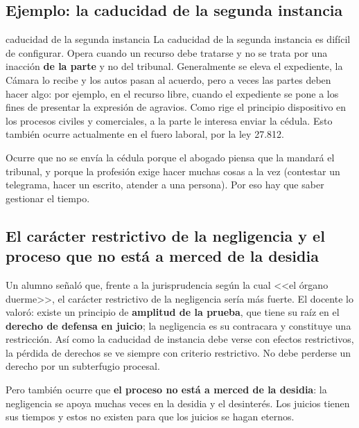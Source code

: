 \documentclass[12pt,oneside]{book}
\begin{document}
\subsection{Ejemplo: la caducidad de la segunda instancia}

\begin{example}{caducidad de la segunda instancia}
La caducidad de la segunda instancia es difícil de configurar. Opera cuando un recurso debe tratarse y no se trata por una inacción \textbf{de la parte} y no del tribunal. Generalmente se eleva el expediente, la Cámara lo recibe y los autos pasan al acuerdo, pero a veces las partes deben hacer algo: por ejemplo, en el recurso libre, cuando el expediente se pone a los fines de presentar la expresión de agravios. Como rige el principio dispositivo en los procesos civiles y comerciales, a la parte le interesa enviar la cédula. Esto también ocurre actualmente en el fuero laboral, por la ley 27.812.

Ocurre que no se envía la cédula porque el abogado piensa que la mandará el tribunal, y porque la profesión exige hacer muchas cosas a la vez (contestar un telegrama, hacer un escrito, atender a una persona). Por eso hay que saber gestionar el tiempo.
\end{example}


\subsection{El carácter restrictivo de la negligencia y el proceso que no está a merced de la desidia}

Un alumno señaló que, frente a la jurisprudencia según la cual <<el órgano duerme>>, el carácter restrictivo de la negligencia sería más fuerte. El docente lo valoró: existe un principio de \textbf{amplitud de la prueba}, que tiene su raíz en el \textbf{derecho de defensa en juicio}; la negligencia es su contracara y constituye una restricción. Así como la caducidad de instancia debe verse con efectos restrictivos, la pérdida de derechos se ve siempre con criterio restrictivo. No debe perderse un derecho por un subterfugio procesal.

Pero también ocurre que \textbf{el proceso no está a merced de la desidia}: la negligencia se apoya muchas veces en la desidia y el desinterés. Los juicios tienen sus tiempos y estos no existen para que los juicios se hagan eternos.
\end{document}
